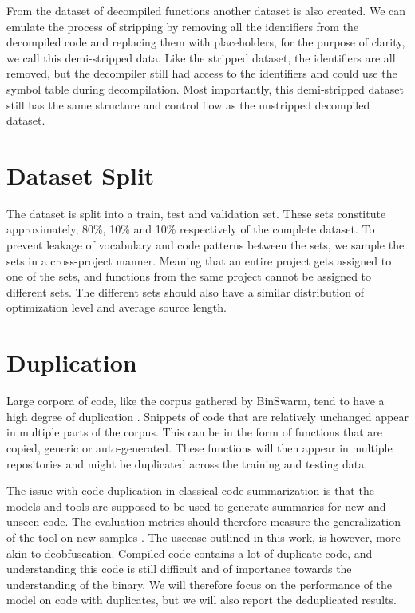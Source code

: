From the dataset of decompiled functions another dataset is also created. We can emulate the process of stripping by removing all the identifiers from the decompiled code and replacing them with placeholders, for the purpose of clarity, we call this demi-stripped data. Like the stripped dataset, the identifiers are all removed, but the decompiler still had access to the identifiers and could use the symbol table during decompilation. Most importantly, this demi-stripped dataset still has the same structure and control flow as the unstripped decompiled dataset.

\section{Dataset Split}
The dataset is split into a train, test and validation set. These sets constitute approximately, 80\%, 10\% and 10\% respectively\cite{recommend_summarization} of the complete dataset. To prevent leakage of vocabulary and code patterns between the sets, we sample the sets in a cross-project manner. Meaning that an entire project gets assigned to one of the sets, and functions from the same project cannot be assigned to different sets. The different sets should also have a similar distribution of optimization level and average source length.

\section{Duplication}
Large corpora of code, like the corpus gathered by BinSwarm, tend to have a high degree of duplication \cite{leclair_recommendations}. Snippets of code that are relatively unchanged appear in multiple parts of the corpus. This can be in the form of functions that are copied, generic or auto-generated. These functions will then appear in multiple repositories and might be duplicated across the training and testing data.

The issue with code duplication in classical code summarization is that the models and tools are supposed to be used to generate summaries for new and unseen code. The evaluation metrics should therefore measure the generalization of the tool on new samples \cite{allamanis_adverse}. The usecase outlined in this work, is however, more akin to deobfuscation. Compiled code contains a lot of duplicate code, and understanding this code is still difficult and of importance towards the understanding of the binary. We will therefore focus on the performance of the model on code with duplicates, but we will also report the deduplicated results.

